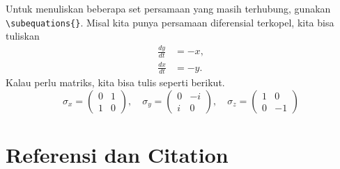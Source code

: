Untuk menuliskan beberapa set persamaan yang masih terhubung, gunakan \verb|\subequations{}|. Misal kita punya persamaan diferensial terkopel, kita bisa tuliskan
\begin{subequations}
  \begin{align}
    \frac{dy}{dt} & = -x , \\
    \frac{dx}{dt} & = -y .
  \end{align}
\end{subequations}
Kalau perlu matriks, kita bisa tulis seperti berikut.
\begin{equation}
  \sigma_x =
  \begin{pmatrix}
    0 & 1 \\
    1 & 0
  \end{pmatrix},\quad
  \sigma_y =
  \begin{pmatrix}
    0 & -i \\
    i & 0
  \end{pmatrix}, \quad
  \sigma_z =
  \begin{pmatrix}
    1 & 0  \\
    0 & -1
  \end{pmatrix}
\end{equation}


\section{Referensi dan Citation}
